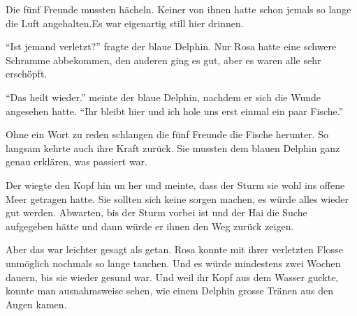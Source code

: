 Die fünf Freunde mussten hächeln. Keiner von ihnen hatte schon jemals so lange die Luft angehalten.Es war eigenartig still hier drinnen.

\enquote{Ist jemand verletzt?} fragte der blaue Delphin. Nur Rosa hatte eine schwere Schramme abbekommen, den anderen ging es gut, aber es waren alle sehr erschöpft.

\enquote{Das heilt wieder.} meinte der blaue Delphin, nachdem er sich die Wunde angesehen hatte. \enquote{Ihr bleibt hier und ich hole uns erst einmal ein paar Fische.}

Ohne ein Wort zu reden schlangen die fünf Freunde die Fische herunter. So langsam kehrte auch ihre Kraft zurück. Sie mussten dem blauen Delphin ganz genau erklären, was passiert war.

Der wiegte den Kopf hin un her und meinte, dass der Sturm sie wohl ins offene Meer getragen hatte. Sie sollten sich keine sorgen machen, es würde alles wieder gut werden. Abwarten, bis der Sturm vorbei ist und der Hai die Suche aufgegeben hätte und dann würde er ihnen den Weg zurück zeigen.

Aber das war leichter gesagt als getan. Rosa konnte mit ihrer verletzten Flosse unmöglich nochmals so lange tauchen. Und es würde mindestens zwei Wochen dauern, bis sie wieder gesund war. Und weil ihr Kopf aus dem Wasser guckte, konnte man ausnahmsweise sehen, wie einem Delphin grosse Tränen aus den Augen kamen.

